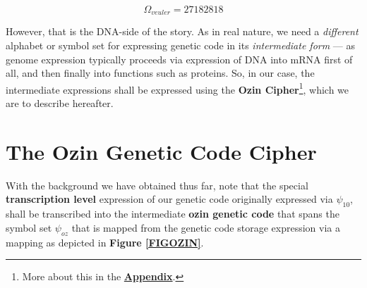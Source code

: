 \documentclass[a4paper, 18pt]{book} %
\begin{document}
\begin{equation}
\label{EQDNAV}
\Omega_{veuler} = 27182818
\end{equation}


However, that is the DNA-side of the story. As in real nature, we need a \textit{different} alphabet or symbol set for expressing genetic code in its \textit{intermediate form} --- as genome expression typically proceeds via expression of DNA into mRNA first of all, and then finally into functions such as proteins. So, in our case, the intermediate expressions shall be expressed using the \textbf{Ozin Cipher}\footnote{More about this in the \textbf{\hyperref[APPOZIN]{Appendix}}.}, which we are to describe hereafter.


\section{The Ozin Genetic Code Cipher}
\label{SECOZIN}

With the background we have obtained thus far, note that the special \textbf{transcription level} expression of our genetic code originally expressed via $\psi_{10}$, shall be transcribed into the intermediate \textbf{ozin genetic code} that spans the symbol set $\psi_{oz}$ that is mapped from the genetic code storage expression via a mapping as depicted in \textbf{Figure \ref{FIGOZIN}}.
\end{document}
